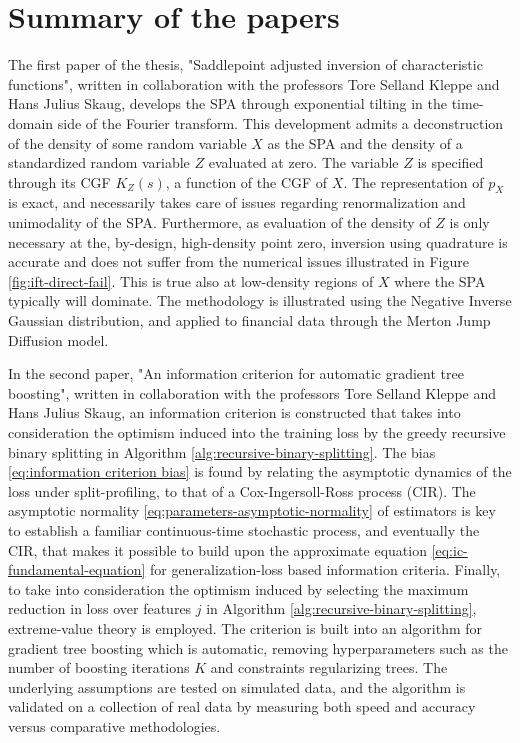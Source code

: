 \chapter{Summary of the papers}
\label{chap:summary}

The first paper of the thesis, "Saddlepoint adjusted inversion of characteristic functions", written in collaboration with the professors Tore Selland Kleppe and Hans Julius Skaug, develops the SPA through exponential tilting in the time-domain side of the Fourier transform. 
This development admits a deconstruction of the density of some random variable $X$ as the SPA and the density of a standardized random variable $Z$ evaluated at zero. The variable $Z$ is specified through its CGF $K_Z(s)$, a function of the CGF of $X$.
The representation of $p_X$ is exact, and necessarily takes care of issues regarding renormalization and unimodality of the SPA.
Furthermore, as evaluation of the density of $Z$ is only necessary at the, by-design, high-density point zero, inversion using quadrature is accurate and does not suffer from the numerical issues illustrated in Figure \ref{fig:ift-direct-fail}. This is true also at low-density regions of $X$ where the SPA typically will dominate.
The methodology is illustrated using the Negative Inverse Gaussian distribution, and applied to financial data through the Merton Jump Diffusion model.


In the second paper, "An information criterion for automatic gradient tree boosting", written in collaboration with the professors Tore Selland Kleppe and Hans Julius Skaug, an information criterion is constructed that takes into consideration the optimism induced into the training loss by the greedy recursive binary splitting in Algorithm \ref{alg:recursive-binary-splitting}.
The bias \eqref{eq:information criterion bias} is found by relating the asymptotic dynamics of the loss under split-profiling, to that of a Cox-Ingersoll-Ross process (CIR).
The asymptotic normality \eqref{eq:parameters-asymptotic-normality} of estimators is key to establish a familiar continuous-time stochastic process, and eventually the CIR, that makes it possible to build upon the approximate equation \eqref{eq:ic-fundamental-equation} for generalization-loss based information criteria.
Finally, to take into consideration the optimism induced by selecting the maximum reduction in loss over features $j$ in Algorithm \ref{alg:recursive-binary-splitting}, extreme-value theory is employed.
The criterion is built into an algorithm for gradient tree boosting which is automatic, removing hyperparameters such as the number of boosting iterations $K$ and constraints regularizing trees.
The underlying assumptions are tested on simulated data, and the algorithm is validated on a collection of real data by measuring both speed and accuracy versus comparative methodologies.


